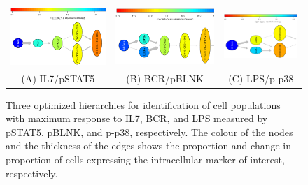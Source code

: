 \begin{figure}[!h]
  \begin{center}
    \begin{tabular}{c||c||c}
      \includegraphics[width=.6\textwidth,angle=270]{figs/rchy/IL7}&
      \includegraphics[width=.6\textwidth,angle=270]{figs/rchy/BCR}&
      \includegraphics[width=.6\textwidth,angle=270]{figs/rchy/LPS}\\
      (A) IL7/pSTAT5 &(B) BCR/pBLNK &(C) LPS/p-p38\\
    \end{tabular}
  \end{center}
  \caption{Three optimized hierarchies for identification of cell populations with maximum response to IL7, BCR, and LPS measured by pSTAT5, pBLNK, and p-p38, respectively.
    The colour of the nodes and the thickness of the edges shows the proportion and change in proportion of cells expressing the intracellular marker of interest, respectively.
  }
  \label{r1:CyTOF}
\end{figure}


